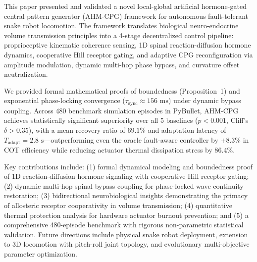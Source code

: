 \documentclass{iopjournal}
\begin{document}
This paper presented and validated a novel local-global artificial hormone-gated central pattern generator (AHM-CPG) framework for autonomous fault-tolerant snake robot locomotion. The framework translates biological neuro-endocrine volume transmission principles into a 4-stage decentralized control pipeline: proprioceptive kinematic coherence sensing, 1D spinal reaction-diffusion hormone dynamics, cooperative Hill receptor gating, and adaptive CPG reconfiguration via amplitude modulation, dynamic multi-hop phase bypass, and curvature offset neutralization.

We provided formal mathematical proofs of boundedness (Proposition~1) and exponential phase-locking convergence ($\tau_{\text{sync}} \approx 156\text{ ms}$) under dynamic bypass coupling. Across 480 benchmark simulation episodes in PyBullet, AHM-CPG achieves statistically significant superiority over all 5 baselines ($p < 0.001$, Cliff's $\delta > 0.35$), with a mean recovery ratio of $69.1\%$ and adaptation latency of $T_{\text{adapt}} = 2.8\text{ s}$—outperforming even the oracle fault-aware controller by $+8.3\%$ in COT efficiency while reducing actuator thermal dissipation stress by $86.4\%$.

Key contributions include: (1) formal dynamical modeling and boundedness proof of 1D reaction-diffusion hormone signaling with cooperative Hill receptor gating; (2) dynamic multi-hop spinal bypass coupling for phase-locked wave continuity restoration; (3) bidirectional neurobiological insights demonstrating the primacy of allosteric receptor cooperativity in volume transmission; (4) quantitative thermal protection analysis for hardware actuator burnout prevention; and (5) a comprehensive 480-episode benchmark with rigorous non-parametric statistical validation. Future directions include physical snake robot deployment, extension to 3D locomotion with pitch-roll joint topology, and evolutionary multi-objective parameter optimization.



\end{document}
